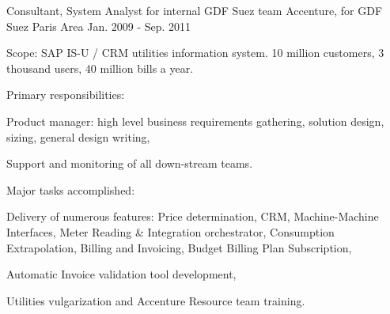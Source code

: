 \begin{cventries}
  \cventry
    {Consultant, System Analyst for internal GDF Suez team} %
    {Accenture, for GDF Suez} %
    {Paris Area} %
    {Jan. 2009 - Sep. 2011} %
    {
      \begin{cvitems} %
        \item {Scope: SAP IS-U / CRM utilities information system. 10 million customers, 3 thousand users, 40 million bills a year.}
        \item {Primary responsibilities:}
        \begin{cvsubitems}
          \item {Product manager: high level business requirements gathering, solution design, sizing, general design writing,}
          \item {Support and monitoring of all down-stream teams.}
        \end{cvsubitems}
        \item {Major tasks accomplished:}
        \begin{cvsubitems}
          \item {Delivery of numerous features: Price determination, CRM, Machine-Machine Interfaces, Meter Reading \& Integration orchestrator, Consumption Extrapolation, Billing and Invoicing, Budget Billing Plan Subscription,}
          \item {Automatic Invoice validation tool development,}
          \item {Utilities vulgarization and Accenture Resource team training.}
        \end{cvsubitems}
      \end{cvitems}
    }


\end{cventries}
